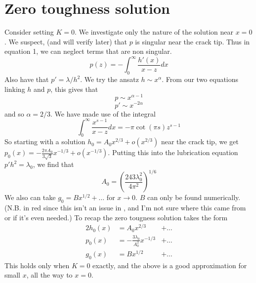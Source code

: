 \documentclass{article}
\begin{document}
\section{Zero toughness solution}
% 
Consider setting $K=0$. We investigate only the nature of the solution near
$x=0$. We suspect, (and will verify later) that $p$ is singular near the crack
tip. Thus in equation 1, we can neglect terms that are non singular. 
\[ p(z) = -\int_0^{\infty} \frac{h'(x)}{x-z} dx \]
Also have that $p' = \lambda/h^2$. We try the ansatz $h \sim x^{\alpha}$. From
our two equations linking $h$ and $p$, this gives that
\[ p \sim x^{\alpha-1} \]
\[ p' \sim x^{-2\alpha} \]
and so $\alpha = 2/3$. We have made use of the integral
\[ \int_0^\infty \frac{x^{s-1}}{x-z}dx = -\pi \cot (\pi s)z^{s-1} \]
So starting with a solution $h_0 = A_0 x^{2/3} + o(x^{2/3})$ near the
crack tip, we get $\displaystyle p_0(x) = -\frac{2\pi A_0}{3\sqrt{3}}x^{-1/3} 
+ o(x^{-1/3})$. Putting this into the lubrication equation 
$p' h^2 = \lambda_0$, we find that 
\[ A_0 = \left( \frac{243 \lambda_0^2}{4\pi^2} \right)^{1/6} \]
{\color{red}We also can take $g_0 = Bx^{1/2}+\dots$ for $x\to0$. $B$ can only
be found numerically. (N.B. in red since this isn't an issue in \cite{GandD},
and I'm not sure where this came from or if it's even needed.)}
To recap the zero tougness solution takes the form
\begin{alignat*}{2}
h_0(x) &= A_0 x^{2/3} &+ \dots \\
p_0(x) &= -\frac{3\lambda_0}{A_0^2} x^{-1/3} &+ \dots \\
g_0(x) &= Bx^{1/2} &+ \dots 
\end{alignat*}
This holds only when $K=0$ exactly, and the above is a good approximation
for small $x$, all the way to $x=0$.
%
\end{document}
